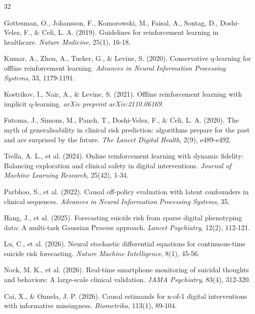 \begin{thebibliography}{32}

Gottesman, O., Johansson, F., Komorowski, M., Faisal, A., Sontag, D., Doshi-Velez, F., \& Celi, L. A. (2019). Guidelines for reinforcement learning in healthcare. \textit{Nature Medicine}, 25(1), 16-18.

Kumar, A., Zhou, A., Tucker, G., \& Levine, S. (2020). Conservative q-learning for offline reinforcement learning. \textit{Advances in Neural Information Processing Systems}, 33, 1179-1191.

Kostrikov, I., Nair, A., \& Levine, S. (2021). Offline reinforcement learning with implicit q-learning. \textit{arXiv preprint arXiv:2110.06169}.

Futoma, J., Simons, M., Panch, T., Doshi-Velez, F., \& Celi, L. A. (2020). The myth of generalisability in clinical risk prediction: algorithms prepare for the past and are surprised by the future. \textit{The Lancet Digital Health}, 2(9), e489-e492.

Trella, A. L., et al. (2024). Online reinforcement learning with dynamic fidelity: Balancing exploration and clinical safety in digital interventions. \textit{Journal of Machine Learning Research}, 25(42), 1-34.

Parbhoo, S., et al. (2022). Causal off-policy evaluation with latent confounders in clinical sequences. \textit{Advances in Neural Information Processing Systems}, 35.

Hang, J., et al. (2025). Forecasting suicide risk from sparse digital phenotyping data: A multi-task Gaussian Process approach. \textit{Lancet Psychiatry}, 12(2), 112-121.

Lu, C., et al. (2026). Neural stochastic differential equations for continuous-time suicide risk forecasting. \textit{Nature Machine Intelligence}, 8(1), 45-56.

Nock, M. K., et al. (2026). Real-time smartphone monitoring of suicidal thoughts and behaviors: A large-scale clinical validation. \textit{JAMA Psychiatry}, 83(4), 312-320.

Cai, X., \& Onnela, J. P. (2026). Causal estimands for n-of-1 digital interventions with informative missingness. \textit{Biometrika}, 113(1), 89-104.


\end{thebibliography}
